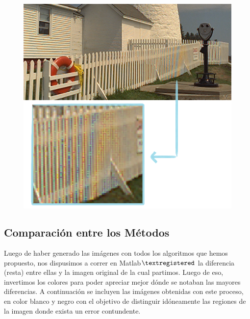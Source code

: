\documentclass[a4paper]{article}
\begin{document}
\begin{figure}[h!]
	\caption{}
	\begin{center}
	\includegraphics[scale=0.08]{imagenes/cercosplineMHC}
	\label{cercosplineMHC}
  \end{center}
\end{figure}



\newpage
\subsection{Comparaci\'on entre los M\'etodos}
Luego de haber generado las im\'agenes con todos los algoritmos que hemos propuesto, nos dispusimos a correr en Matlab$\textregistered$  la diferencia (resta) entre ellas y la imagen original de la cual partimos. Luego de eso, invertimos los colores para poder apreciar mejor d\'onde se notaban las mayores diferencias. A continuaci\'on se incluyen las im\'agenes obtenidas con este proceso, en color blanco y negro con el objetivo de distinguir id\'oneamente las regiones de la imagen donde exista un error contundente.\\
\end{document}

